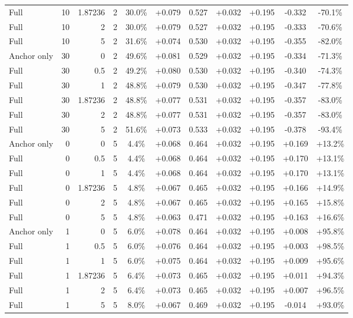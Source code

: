 \begin{table}[htbp]
\begin{tabular}{lrrrccccccc}
Full & 10 & 1.87236 & 2 & 30.0\% & +0.079 & 0.527 & +0.032 & +0.195 & -0.332 & -70.1\% \\
Full & 10 & 2 & 2 & 30.0\% & +0.079 & 0.527 & +0.032 & +0.195 & -0.333 & -70.6\% \\
Full & 10 & 5 & 2 & 31.6\% & +0.074 & 0.530 & +0.032 & +0.195 & -0.355 & -82.0\% \\
Anchor only & 30 & 0 & 2 & 49.6\% & +0.081 & 0.529 & +0.032 & +0.195 & -0.334 & -71.3\% \\
Full & 30 & 0.5 & 2 & 49.2\% & +0.080 & 0.530 & +0.032 & +0.195 & -0.340 & -74.3\% \\
Full & 30 & 1 & 2 & 48.8\% & +0.079 & 0.530 & +0.032 & +0.195 & -0.347 & -77.8\% \\
Full & 30 & 1.87236 & 2 & 48.8\% & +0.077 & 0.531 & +0.032 & +0.195 & -0.357 & -83.0\% \\
Full & 30 & 2 & 2 & 48.8\% & +0.077 & 0.531 & +0.032 & +0.195 & -0.357 & -83.0\% \\
Full & 30 & 5 & 2 & 51.6\% & +0.073 & 0.533 & +0.032 & +0.195 & -0.378 & -93.4\% \\
Anchor only & 0 & 0 & 5 & 4.4\% & +0.068 & 0.464 & +0.032 & +0.195 & +0.169 & +13.2\% \\
Full & 0 & 0.5 & 5 & 4.4\% & +0.068 & 0.464 & +0.032 & +0.195 & +0.170 & +13.1\% \\
Full & 0 & 1 & 5 & 4.4\% & +0.068 & 0.464 & +0.032 & +0.195 & +0.170 & +13.1\% \\
Full & 0 & 1.87236 & 5 & 4.8\% & +0.067 & 0.465 & +0.032 & +0.195 & +0.166 & +14.9\% \\
Full & 0 & 2 & 5 & 4.8\% & +0.067 & 0.465 & +0.032 & +0.195 & +0.165 & +15.8\% \\
Full & 0 & 5 & 5 & 4.8\% & +0.063 & 0.471 & +0.032 & +0.195 & +0.163 & +16.6\% \\
Anchor only & 1 & 0 & 5 & 6.0\% & +0.078 & 0.464 & +0.032 & +0.195 & +0.008 & +95.8\% \\
Full & 1 & 0.5 & 5 & 6.0\% & +0.076 & 0.464 & +0.032 & +0.195 & +0.003 & +98.5\% \\
Full & 1 & 1 & 5 & 6.0\% & +0.075 & 0.464 & +0.032 & +0.195 & +0.009 & +95.6\% \\
Full & 1 & 1.87236 & 5 & 6.4\% & +0.073 & 0.465 & +0.032 & +0.195 & +0.011 & +94.3\% \\
Full & 1 & 2 & 5 & 6.4\% & +0.073 & 0.465 & +0.032 & +0.195 & +0.007 & +96.5\% \\
Full & 1 & 5 & 5 & 8.0\% & +0.067 & 0.469 & +0.032 & +0.195 & -0.014 & +93.0\% \\

\end{tabular}
\end{table}
